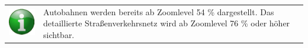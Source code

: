\documentclass[10pt]{scrreprt}
\begin{document}
\vspace{3mm}
\begin{figure}[!htb]
	\centering
    \hspace{5mm}    
\end{figure}

\vspace{3mm}
\begin{tabular}{>{\centering \arraybackslash}m{1cm} m{14cm}}
\includegraphics[scale=0.5]{images/info.eps} & Autobahnen werden bereits ab Zoomlevel 54 \% dargestellt. Das detaillierte Straßenverkehrsnetz wird ab Zoomlevel 76 \% oder höher sichtbar.
\end{tabular}
\end{document}
